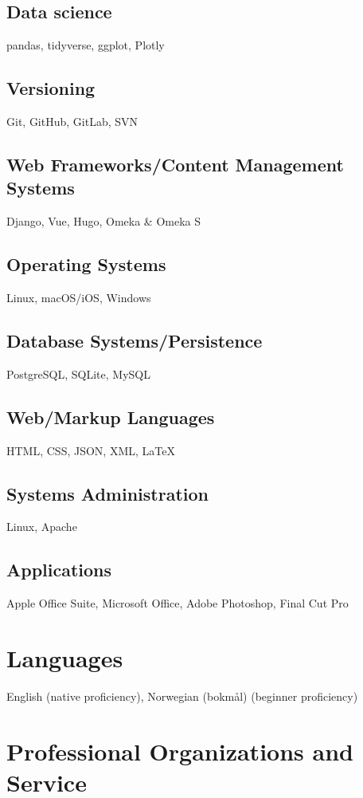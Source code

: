 \documentclass[10pt]{article}
\begin{document}
\subsection*{Data science}
pandas, tidyverse, ggplot, Plotly

\subsection*{Versioning}
Git, GitHub, GitLab, SVN

\subsection*{Web Frameworks/Content Management Systems}
Django, Vue, Hugo, Omeka \& Omeka S

\subsection*{Operating Systems}
Linux, macOS/iOS, Windows

\subsection*{Database Systems/Persistence}
PostgreSQL, SQLite, MySQL

\subsection*{Web/Markup Languages}
HTML, CSS, JSON, XML, \LaTeX

\subsection*{Systems Administration}
Linux, Apache

\subsection*{Applications}
Apple Office Suite, Microsoft Office, Adobe Photoshop, Final Cut Pro

\section{Languages}
English (native proficiency), Norwegian (bokmål) (beginner proficiency)

\section{Professional Organizations and Service}
\end{document}
